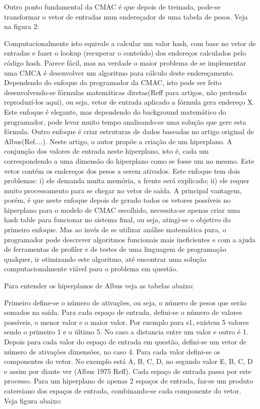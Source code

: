 \documentclass[a4paper, 12pt] {report}
\begin{document}
	Outro ponto fundamental da CMAC é que depois de treinada, pode-se transformar o vetor de entradas num endereçador de uma tabela de pesos. Veja na figura 2:	

Computacionalmente isto equivale a calcular um valor hash, com base no vetor de entradas e fazer o lookup (recuperar o conteúdo) dos endereços calculados pelo código hash. Parece fácil, mas na verdade o maior problema de se implementar uma CMCA é desenvolver um algoritmo para cálculo deste endereçamento. Dependendo do enfoque do programador da CMAC, isto pode ser feito desenvolvendo-se fórmulas matemáticas diretas(Reff para artigos, não pretendo reproduzí-los aqui), ou seja, vetor de entrada aplicado a fórmula gera endereço X. Este enfoque é elegante, mas dependendo do background matemático do programador, pode levar muito tempo analisando-se uma solução que gere esta fórmula. Outro enfoque é criar estruturas de dados baseadas no artigo original de Albus(Ref....). Neste artigo, o autor propõe a criação de um hiperplano. A conjunção dos valores de entrada neste hiperplano, isto é, cada um correspondendo a uma dimensão do hiperplano como se fosse um no mesmo. Este vetor contém os endereços dos pesos a serem ativados. Este enfoque tem dois problemas: i) ele demanda muita memória, a frente será explicado; ii) ele requer muito processamento para se chegar no vetor de saída. A principal vantagem, porém, é que neste enfoque depois de gerado todos os vetores possíveis no hiperplano para o modelo de CMAC escolhido, necessita-se apenas criar uma hash table para funcionar no sistema final, ou seja, atingi-se o objetivo do primeiro enfoque. Mas ao invés de se utilizar análise matemática pura, o programador pode descrever algoritmos funcionais mais ineficientes e com a ajuda de ferramentas de profiler e de testes de uma linguagem de programação qualquer, ir otimizando este algoritmo, até encontrar uma solução computacionalmente viável para o problema em questão.

	Para entender os hiperplanos de Albus veja as tabelas abaixo:


	Primeiro define-se o número de ativações, ou seja, o número de pesos que serão somados na saída. Para cada espaço de entrada, defini-se o número de valores possíveis, o menor valor e o maior valor. Por exemplo para s1, existem 5 valores sendo o primeiro 1 e o último 5. No caso a distancia entre um valor e outro é 1. Depois para cada valor do espaço de entrada em questão, defini-se um vetor de número de ativações dimensões, no caso 4. Para cada valor defini-se os componentes do vetor. No exemplo está A, B, C, D, no segundo valor E, B, C, D e assim por diante ver (Albus 1975 Reff). Cada espaço de entrada passa por este processo.
	Para um hiperplano de apenas 2 espaços de entrada, faz-se um produto catersiano dos espaços de entrada, combinando-se cada componente do vetor. Veja figura abaixo:
\end{document}
